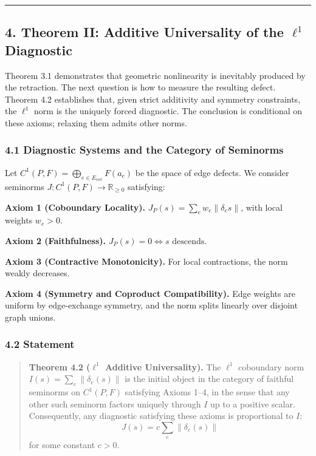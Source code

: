 \documentclass[
]{article}
\begin{document}
\begin{center}\rule{0.5\linewidth}{0.5pt}\end{center}

\subsection{\texorpdfstring{4. Theorem II: Additive Universality of the
\(\ell^1\)
Diagnostic}{4. Theorem II: Additive Universality of the \textbackslash ell\^{}1 Diagnostic}}\label{theorem-ii-additive-universality-of-the-ell1-diagnostic}

Theorem 3.1 demonstrates that geometric nonlinearity is inevitably
produced by the retraction. The next question is how to measure the
resulting defect. Theorem 4.2 establishes that, given strict additivity
and symmetry constraints, the \(\ell^1\) norm is the uniquely forced
diagnostic. The conclusion is conditional on these axioms; relaxing them
admits other norms.

\subsubsection{4.1 Diagnostic Systems and the Category of
Seminorms}\label{diagnostic-systems-and-the-category-of-seminorms}

Let \(C^1(P, F) = \bigoplus_{e \in E_{\text{cov}}} F(a_e)\) be the space
of edge defects. We consider seminorms
\(J: C^1(P,F) \to \mathbb{R}_{\geq 0}\) satisfying:

\textbf{Axiom 1 (Coboundary Locality).}
\(J_P(s) = \sum_{e} w_e \|\delta_e s\|\), with local weights
\(w_e > 0\).

\textbf{Axiom 2 (Faithfulness).} \(J_P(s) = 0 \iff s \text{ descends}\).

\textbf{Axiom 3 (Contractive Monotonicity).} For local contractions, the
norm weakly decreases.

\textbf{Axiom 4 (Symmetry and Coproduct Compatibility).} Edge weights
are uniform by edge-exchange symmetry, and the norm splits linearly over
disjoint graph unions.

\subsubsection{4.2 Statement}\label{statement-1}

\begin{quote}
\textbf{Theorem 4.2 (\(\ell^1\) Additive Universality).} The \(\ell^1\)
coboundary norm \(I(s) = \sum_e \|\delta_e(s)\|\) is the initial object
in the category of faithful seminorms on \(C^1(P,F)\) satisfying Axioms
1--4, in the sense that any other such seminorm factors uniquely through
\(I\) up to a positive scalar. Consequently, any diagnostic satisfying
these axioms is proportional to \(I\):
\[J(s) = c \sum_e \|\delta_e(s)\|\] for some constant \(c > 0\).
\end{quote}
\end{document}
